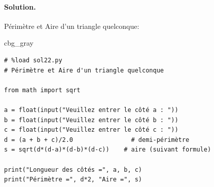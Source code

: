 \documentclass[%
oneside,                 %
final,                   %
10pt,french]{article}
\newenvironment{_cod_tight}[1]{
   \def\FrameCommand{\colorbox{#1}}
   \FrameRule0.6pt\MakeFramed {\FrameRestore}\vskip3mm}
   {\vskip0mm\endMakeFramed}
\newenvironment{cod}[1]{
\bgroup\rmfamily
\fboxsep=0mm\relax
\begin{_cod_tight}{#1}
\list{}{\parsep=-2mm\parskip=0mm\topsep=0pt\leftmargin=2mm
\rightmargin=2\leftmargin\leftmargin=4pt\relax}
\item\relax}
{\endlist\end{_cod_tight}\egroup}
\newenvironment{doconceexercise}{}{}
\begin{document}
\begin{doconceexercise}
\paragraph{Solution.}
Périmètre et Aire d'un triangle quelconque:

\begin{cod}{cbg_gray}\begin{verbatim}
# %load sol22.py
# Périmètre et Aire d'un triangle quelconque

from math import sqrt

a = float(input("Veuillez entrer le côté a : "))
b = float(input("Veuillez entrer le côté b : "))
c = float(input("Veuillez entrer le côté c : "))
d = (a + b + c)/2.0                # demi-périmètre
s = sqrt(d*(d-a)*(d-b)*(d-c))    # aire (suivant formule)

print("Longueur des côtés =", a, b, c)
print("Périmètre =", d*2, "Aire =", s)
\end{verbatim}
\end{cod}
\noindent

\end{doconceexercise}


\end{document}
